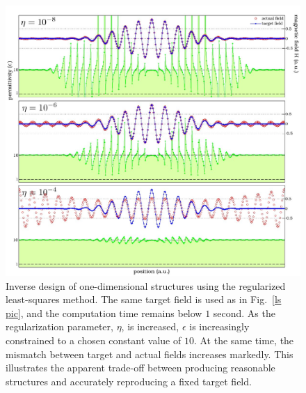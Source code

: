 \begin{figure}[htbp]\centering
\includegraphics[width=\textwidth]{p1/regularized}
\caption{Inverse design of one-dimensional structures using the regularized least-squares method. The same target field is used as in Fig.~\ref{ls pic}, and the computation time remains below $1$ second. As the regularization parameter, $\eta$, is increased, $\epsilon$ is increasingly constrained to a chosen constant value of $10$. At the same time, the mismatch between target and actual fields increases markedly. This illustrates the apparent trade-off between producing reasonable structures and accurately reproducing a fixed target field.}
\label{regls pic}
\end{figure}
